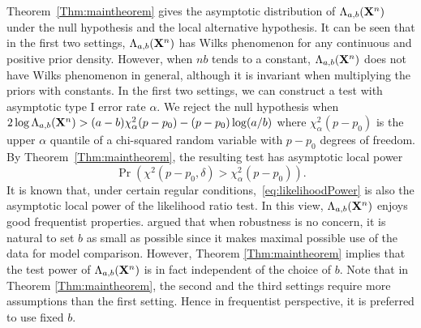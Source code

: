 \documentclass[11pt]{article}
\theoremstyle{plain}
\theoremstyle{definition}
\theoremstyle{remark}
\begin{document}
Theorem~\ref{Thm:maintheorem} gives the asymptotic distribution of $\Lambda_{a,b} (\mathbf{X}^n)$ under the null hypothesis and the local alternative hypothesis.
It can be seen that in the first two settings, $\Lambda_{a,b}(\mathbf{X}^n)$ has Wilks phenomenon for any continuous and positive prior density.
However, when $nb$ tends to a constant, $\Lambda_{a,b}(\mathbf{X}^n)$ does not have Wilks phenomenon in general, although it is invariant when multiplying the priors with constants.
In the first two settings, we can construct a test with asymptotic type I error rate $\alpha$.
We reject the null hypothesis when $ 2\log \Lambda_{a,b} (\mathbf{X}^n)>(a-b)\chi^2_{\alpha}(p-p_0)-(p-p_0)\log (a/b) $ where $\chi^2_{\alpha}(p-p_0)$ is the upper $\alpha$ quantile of a chi-squared random variable with $p-p_0$ degrees of freedom.
By Theorem~\ref{Thm:maintheorem}, the resulting test has asymptotic local power
\begin{equation}\label{eq:likelihoodPower}
\Pr \left( \chi^2(p-p_0,\delta)> \chi^2_{\alpha}(p-p_0) \right).
\end{equation}
It is known that, under certain regular conditions,~\eqref{eq:likelihoodPower} is also the asymptotic local power of the likelihood ratio test. 
In this view, $\Lambda_{a,b} (\mathbf{X}^n)$ enjoys good frequentist properties.
\cite{Fractional1995} argued that when robustness is no concern, it is natural to set $b$ as small as possible since it makes maximal possible use of the data for model comparison.
However, Theorem \ref{Thm:maintheorem} implies that the test power of $\Lambda_{a,b}(\mathbf{X}^n)$ is in fact independent of the choice of $b$.
Note that in Theorem \ref{Thm:maintheorem}, the second and the third settings require more assumptions than the first setting.
Hence in frequentist perspective, it is preferred to use fixed $b$.
\end{document}

